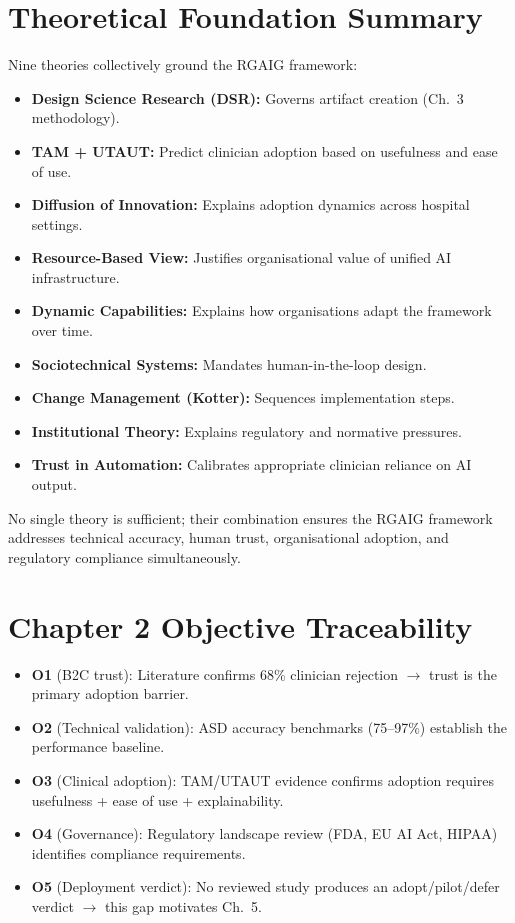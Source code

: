 \section{Theoretical Foundation Summary}

Nine theories collectively ground the RGAIG framework:
\begin{itemize}[leftmargin=*, itemsep=2pt]
\item \textbf{Design Science Research (DSR):} Governs artifact creation (Ch.~3 methodology).
\item \textbf{TAM + UTAUT:} Predict clinician adoption based on usefulness and ease of use.
\item \textbf{Diffusion of Innovation:} Explains adoption dynamics across hospital settings.
\item \textbf{Resource-Based View:} Justifies organisational value of unified AI infrastructure.
\item \textbf{Dynamic Capabilities:} Explains how organisations adapt the framework over time.
\item \textbf{Sociotechnical Systems:} Mandates human-in-the-loop design.
\item \textbf{Change Management (Kotter):} Sequences implementation steps.
\item \textbf{Institutional Theory:} Explains regulatory and normative pressures.
\item \textbf{Trust in Automation:} Calibrates appropriate clinician reliance on AI output.
\end{itemize}

\noindent No single theory is sufficient; their combination ensures the RGAIG framework addresses technical accuracy, human trust, organisational adoption, and regulatory compliance simultaneously.

\section{Chapter 2 Objective Traceability}

\begin{itemize}[leftmargin=*, itemsep=3pt]
\item \textbf{O1} (B2C trust): Literature confirms 68\% clinician rejection $\to$ trust is the primary adoption barrier.
\item \textbf{O2} (Technical validation): ASD accuracy benchmarks (75--97\%) establish the performance baseline.
\item \textbf{O3} (Clinical adoption): TAM/UTAUT evidence confirms adoption requires usefulness + ease of use + explainability.
\item \textbf{O4} (Governance): Regulatory landscape review (FDA, EU AI Act, HIPAA) identifies compliance requirements.
\item \textbf{O5} (Deployment verdict): No reviewed study produces an adopt/pilot/defer verdict $\to$ this gap motivates Ch.~5.
\end{itemize}
